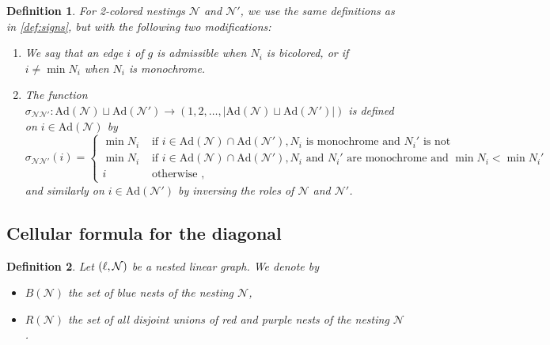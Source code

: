 \documentclass[twoside, 12pt]{amsart}
\newtheorem{definition}{Definition}[section]
\theoremstyle{remark}
\begin{document}
\begin{definition} 
 For 2-colored nestings $\mathcal{N}$ and $\mathcal{N}'$, we use the same definitions as in \cref{def:signs}, but with the following two modifications:
\begin{enumerate}[leftmargin=*]
\item[(2)] We say that an edge $i$ of $g$ is \emph{admissible} when $N_i$ is bicolored, or if $i \neq \min N_i$ when $N_i$ is monochrome. 
\item[(4)] The function $\sigma_{\mathcal{N}\mathcal{N}'}: \mathrm{Ad}(\mathcal{N})\sqcup \mathrm{Ad}(\mathcal{N}') \to (1,2,\ldots,|\mathrm{Ad}(\mathcal{N})\sqcup \mathrm{Ad}(\mathcal{N}')|)$ is defined on $i \in \mathrm{Ad}(\mathcal{N})$ by 
\begin{equation*}
  \sigma_{\mathcal{N}\mathcal{N}'}(i)= 
  \begin{cases}
    \min N_i & \text{ if } i \in \mathrm{Ad}(\mathcal{N})\cap \mathrm{Ad}(\mathcal{N}') , N_i \text{ is monochrome and } N_i' \text{ is not} \\
    \min N_i & \text{ if } i \in \mathrm{Ad}(\mathcal{N})\cap \mathrm{Ad}(\mathcal{N}'), N_i \text{ and } N_i' \text{ are monochrome and } \min N_i < \min N_i' \\ 
    i & \text{ otherwise ,} 
  \end{cases}
\end{equation*}
and similarly on $i \in \mathrm{Ad}(\mathcal{N}')$ by inversing the roles of $\mathcal{N}$ and $\mathcal{N}'$.
\end{enumerate}
\end{definition}

\subsection{Cellular formula for the diagonal} \label{ss:cellular-formula}

\begin{definition}
Let $(\ell,\mathcal{N})$ be a nested linear graph. We denote by 
\begin{itemize}[leftmargin=*]
  \item $B(\mathcal{N})$ the set of blue nests of the nesting $\mathcal{N}$,
  \item $R(\mathcal{N})$ the set of all disjoint \emph{unions} of red and purple nests of the nesting $\mathcal{N}$.
\end{itemize}
\end{definition}
\end{document}
